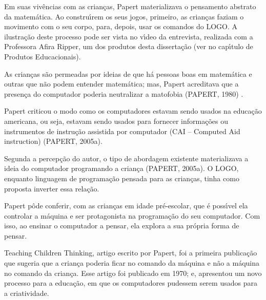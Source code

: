 \documentclass[
12pt,		%
openright,	%
twoside,  %
a4paper,			%
chapter=TITLE,		%
english,			%
french,				%
spanish,			%
brazil				%
]{USPSC-classe/USPSC}
\begin{document}
Em suas viv\^encias com as crian\c{c}as, Papert materializava o pensamento abstrato da matem\'atica. Ao constru\'{\i}rem os seus jogos, primeiro, as crian\c{c}as faziam o movimento com o seu corpo, para, depois, usar os comandos do LOGO. A ilustra\c{c}\~ao deste processo pode ser vista no v\'{\i}deo  da entrevista, realizada com a Professora Afira Ripper,  um dos produtos desta disserta\c{c}\~ao (ver no cap\'{\i}tulo de Produtos Educacionais).








As crian\c{c}as s\~ao permeadas por ideias de que h\'a pessoas boas em matem\'atica e outras que n\~ao podem entender matem\'atica; mas, Papert acreditava que a presen\c{c}a do computador poderia neutralizar a matofobia  (PAPERT, 1980) .








Papert criticou o modo como os computadores estavam sendo usados na educa\c{c}\~ao americana, ou seja, estavam sendo usados para fornecer informa\c{c}\~oes ou instrumentos de instru\c{c}\~ao assistida por computador (CAI – Computed Aid instruction)  (PAPERT, 2005a).








Segunda a percep\c{c}\~ao do autor, o tipo de abordagem existente materializava a ideia do computador programando a crian\c{c}a (PAPERT, 2005a). O LOGO, enquanto linguagem de programa\c{c}\~ao pensada para as crian\c{c}as, tinha como proposta inverter essa rela\c{c}\~ao.








Papert p\^ode conferir, com as crian\c{c}as em idade pr\'e-escolar, que \'e poss\'{\i}vel ela controlar a m\'aquina e ser protagonista na programa\c{c}\~ao do seu computador. Com isso, ao ensinar o computador a pensar, ela explora a sua pr\'opria forma de pensar.








Teaching Children Thinking, artigo escrito por Papert, foi a primeira publica\c{c}\~ao que sugeria que a crian\c{c}a poderia ficar no comando da m\'aquina e n\~ao a m\'aquina no comando da crian\c{c}a.  Esse artigo  foi publicado em 1970; e,  apresentou um novo processo para a educa\c{c}\~ao, em que os computadores pudessem serem usados para a criatividade.
\end{document}
